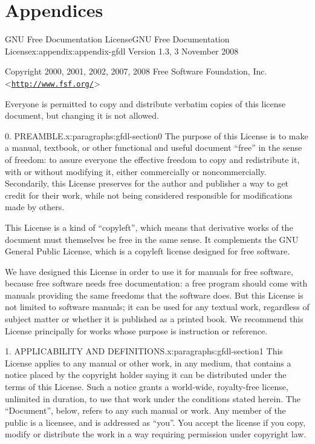 \documentclass[twoside,10pt,]{book}
\numberwithin{equation}{part}
\begin{document}
\part*{Appendices}%
%
%
\typeout{************************************************}
\typeout{************************************************}
%
\begin{appendixptx}{GNU Free Documentation License}{}{GNU Free Documentation License}{}{}{x:appendix:appendix-gfdl}
Version 1.3, 3 November 2008%
\par
Copyright \textcopyright{} 2000, 2001, 2002, 2007, 2008 Free Software Foundation, Inc. \textless{}\href{http://www.fsf.org/}{\nolinkurl{http://www.fsf.org/}}\textgreater{}%
\par
Everyone is permitted to copy and distribute verbatim copies of this license document, but changing it is not allowed.%
\begin{paragraphs}{0. PREAMBLE.}{x:paragraphs:gfdl-section0}%
The purpose of this License is to make a manual, textbook, or other functional and useful document ``free'' in the sense of freedom: to assure everyone the effective freedom to copy and redistribute it, with or without modifying it, either commercially or noncommercially. Secondarily, this License preserves for the author and publisher a way to get credit for their work, while not being considered responsible for modifications made by others.%
\par
This License is a kind of ``copyleft'', which means that derivative works of the document must themselves be free in the same sense. It complements the GNU General Public License, which is a copyleft license designed for free software.%
\par
We have designed this License in order to use it for manuals for free software, because free software needs free documentation: a free program should come with manuals providing the same freedoms that the software does. But this License is not limited to software manuals; it can be used for any textual work, regardless of subject matter or whether it is published as a printed book. We recommend this License principally for works whose purpose is instruction or reference.%
\end{paragraphs}%
\begin{paragraphs}{1. APPLICABILITY AND DEFINITIONS.}{x:paragraphs:gfdl-section1}%
This License applies to any manual or other work, in any medium, that contains a notice placed by the copyright holder saying it can be distributed under the terms of this License. Such a notice grants a world-wide, royalty-free license, unlimited in duration, to use that work under the conditions stated herein. The ``Document'', below, refers to any such manual or work. Any member of the public is a licensee, and is addressed as ``you''. You accept the license if you copy, modify or distribute the work in a way requiring permission under copyright law.%

\end{paragraphs}
\end{appendixptx}
\end{document}
